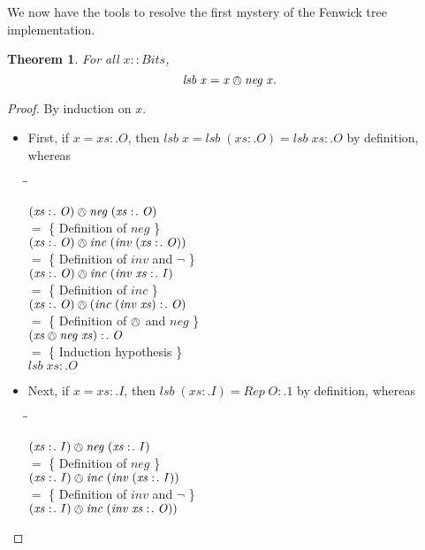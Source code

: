 \documentclass{jfp}
\newcommand{\Conid}[1]{\mathit{#1}}
\newcommand{\Varid}[1]{\mathit{#1}}
\newenvironment{sproof}{%
    \begin{tabbing}
    \phantom{$\equiv$} \= \qquad\qquad\qquad\qquad\qquad \= \kill
}{
    \end{tabbing}
}
\newcommand{\stmt}[1]{\> \ensuremath{#1} \\}
\newcommand{\reason}[2]{\ensuremath{#1} \>\> \{ \quad #2 \quad \} \\}
\newtheorem{thm}{Theorem}[section]
\theoremstyle{definition}
\theoremstyle{remark}
\begin{document}
We now have the tools to resolve the first mystery of the Fenwick tree
implementation.
\begin{thm}
  For all \ensuremath{\Varid{x}\mathbin{::}\Conid{Bits}}, \[ \ensuremath{\Varid{lsb}\;\Varid{x}\mathrel{=}\Varid{x}\owedge\Varid{neg}\;\Varid{x}}. \]
\end{thm}
\begin{proof}
By induction on \ensuremath{\Varid{x}}.
\begin{itemize}
\item First, if \ensuremath{\Varid{x}\mathrel{=}\Varid{xs}\mathrel{:\!.}\Conid{O}}, then \ensuremath{\Varid{lsb}\;\Varid{x}\mathrel{=}\Varid{lsb}\;(\Varid{xs}\mathrel{:\!.}\Conid{O})\mathrel{=}\Varid{lsb}\;\Varid{xs}\mathrel{:\!.}\Conid{O}}
  by definition, whereas
  \begin{sproof}
    \stmt{\ensuremath{(\Varid{xs}\mathrel{:\!.}\Conid{O})\owedge\Varid{neg}\;(\Varid{xs}\mathrel{:\!.}\Conid{O})}}
    \reason{=}{Definition of \ensuremath{\Varid{neg}}}
    \stmt{\ensuremath{(\Varid{xs}\mathrel{:\!.}\Conid{O})\owedge\Varid{inc}\;(\Varid{inv}\;(\Varid{xs}\mathrel{:\!.}\Conid{O}))}}
    \reason{=}{Definition of \ensuremath{\Varid{inv}} and \ensuremath{\neg}}
    \stmt{\ensuremath{(\Varid{xs}\mathrel{:\!.}\Conid{O})\owedge\Varid{inc}\;(\Varid{inv}\;\Varid{xs}\mathrel{:\!.}\Conid{I})}}
    \reason{=}{Definition of \ensuremath{\Varid{inc}}}
    \stmt{\ensuremath{(\Varid{xs}\mathrel{:\!.}\Conid{O})\owedge(\Varid{inc}\;(\Varid{inv}\;\Varid{xs})\mathrel{:\!.}\Conid{O})}}
    \reason{=}{Definition of \ensuremath{\owedge} and \ensuremath{\Varid{neg}}}
    \stmt{\ensuremath{(\Varid{xs}\owedge\Varid{neg}\;\Varid{xs})\mathrel{:\!.}\Conid{O}}}
    \reason{=}{Induction hypothesis}
    \stmt{\ensuremath{\Varid{lsb}\;\Varid{xs}\mathrel{:\!.}\Conid{O}}}
  \end{sproof}
\item Next, if \ensuremath{\Varid{x}\mathrel{=}\Varid{xs}\mathrel{:\!.}\Conid{I}}, then \ensuremath{\Varid{lsb}\;(\Varid{xs}\mathrel{:\!.}\Conid{I})\mathrel{=}\Conid{Rep}\;\Conid{O}\mathrel{:\!.}\mathrm{1}} by
  definition, whereas
  \begin{sproof}
    \stmt{\ensuremath{(\Varid{xs}\mathrel{:\!.}\Conid{I})\owedge\Varid{neg}\;(\Varid{xs}\mathrel{:\!.}\Conid{I})}}
    \reason{=}{Definition of \ensuremath{\Varid{neg}}}
    \stmt{\ensuremath{(\Varid{xs}\mathrel{:\!.}\Conid{I})\owedge\Varid{inc}\;(\Varid{inv}\;(\Varid{xs}\mathrel{:\!.}\Conid{I}))}}
    \reason{=}{Definition of \ensuremath{\Varid{inv}} and \ensuremath{\neg}}
    \stmt{\ensuremath{(\Varid{xs}\mathrel{:\!.}\Conid{I})\owedge\Varid{inc}\;(\Varid{inv}\;\Varid{xs}\mathrel{:\!.}\Conid{O}))}}

\end{sproof}
\end{itemize}
\end{proof}
\end{document}
